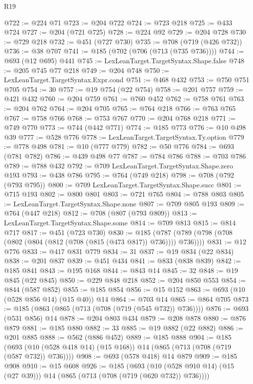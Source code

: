 \begin{lexlean}{R19}
\begin{coremodule}
@722 := @224 @71
@723 := @204 @722
@724 := @723 @218
@725 := @433 @724
@727 := @204 (@721 @725)
@728 := @224 @92
@729 := @204 @728
@730 := @729 @218
@732 := @451 (@727 @730)
@735 := @708 (@719 (@426 @732))
@736 := @38 @707
@741 := @185 (@702 (@706 (@713 (@735 @736))))
@744 := @693 (@12 @695) @441
@745 := LexLeanTarget.TargetSyntax.Shape.false
@748 := @205 @745 @77 @218
@749 := @204 @748
@750 := LexLeanTarget.TargetSyntax.Expr.cond
@751 := @468 @432
@753 := @750 @751 @705
@754 := 30
@757 := @19 @754 (@22 @754)
@758 := @201 @757
@759 := @421 @432
@760 := @204 @759
@761 := @760 @452
@762 := @758 @761
@763 := @204 @762
@764 := @204 @705
@765 := @764 @218
@766 := @763 @765
@767 := @758 @766
@768 := @753 @767
@770 := @204 @768 @218
@771 := @749 @770
@773 := @744 (@442 @771)
@774 := @185 @773
@776 := @10 @498 @39
@777 := @528 @776
@778 := LexLeanTarget.TargetSyntax.Ty.option
@779 := @778 @498
@781 := @10 (@777 @779)
@782 := @50 @776
@784 := @693 (@781 @782)
@786 := @439 @498 @77
@787 := @784 @786
@788 := @703 @786
@789 := @788 @432
@792 := @709 LexLeanTarget.TargetSyntax.Shape.zero @193
@793 := @438 @786
@795 := @764 (@749 @218)
@798 := @708 (@792 (@793 @795))
@800 := @709 LexLeanTarget.TargetSyntax.Shape.succ
@801 := @715 @193
@802 := @800 @801
@803 := @721 @765
@804 := @788 @803
@805 := LexLeanTarget.TargetSyntax.Shape.none
@807 := @709 @805 @193
@809 := @764 (@447 @218)
@812 := @708 (@807 (@793 @809))
@813 := LexLeanTarget.TargetSyntax.Shape.some
@814 := @709 @813
@815 := @814 @717
@817 := @451 (@723 @730)
@830 := @185 (@787 (@789 (@798 (@708 (@802 (@804 (@812 (@708 (@815 (@473 @817)) @736)))) @736))))
@831 := @12 @776
@833 := @417 @831 @779
@834 := 31
@837 := @19 @834 (@22 @834)
@838 := @201 @837
@839 := @451 @434
@841 := @833 (@838 @839)
@842 := @185 @841
@843 := @195 @168
@844 := @843 @14
@845 := 32
@848 := @19 @845 (@22 @845)
@850 := @229 @848 @218
@852 := @204 @850 @553
@854 := @844 (@587 @852)
@855 := @185 @854
@856 := @15 @152
@863 := @693 (@10 (@528 @856 @14) (@15 @40)) @14
@864 := @703 @14
@865 := @864 @705
@873 := @185 (@863 (@865 (@713 (@708 (@719 (@545 @732)) @736))))
@876 := @693 (@531 @856) @14
@878 := @204 @803 @434
@879 := @208 @878
@880 := @876 @879
@881 := @185 @880
@882 := 33
@885 := @19 @882 (@22 @882)
@886 := @201 @885
@888 := @562 (@886 @452)
@889 := @185 @888
@904 := @185
    (@693 (@10 (@528 @418 @14) (@15 @168)) @14 (@865 (@713 (@708 (@719 (@587 @732)) @736))))
@908 := @693 (@578 @418) @14 @879
@909 := @185 @908
@910 := @15 @608
@926 := @185
    (@693 (@10 (@528 @910 @14) (@15 (@27 @39))) @14 (@865 (@713 (@708 (@719 (@620 @732)) @736))))

\end{coremodule}
\end{lexlean}
